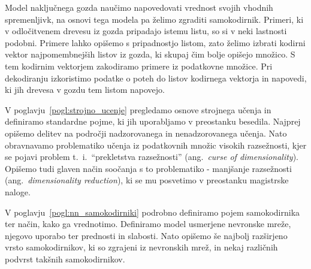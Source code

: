 \documentclass[12pt,a4paper,twoside]{article}
\theoremstyle{definition} %
\theoremstyle{plain} %
\numberwithin{equation}{section}  %
\begin{document}
Model naključnega gozda naučimo napovedovati vrednost svojih vhodnih spremenljivk, na osnovi tega modela pa želimo zgraditi samokodirnik.
Primeri, ki v odločitvenem drevesu iz gozda pripadajo istemu listu, so si v neki lastnosti podobni.
Primere lahko opišemo s pripadnostjo listom, zato želimo izbrati kodirni vektor najpomembnejših listov iz gozda, ki skupaj čim bolje opišejo množico.
S tem kodirnim vektorjem zakodiramo primere iz podatkovne množice.
Pri dekodiranju izkoristimo podatke o poteh do listov kodirnega vektorja in napovedi, ki jih drevesa v gozdu tem listom napovejo.


V poglavju~\ref{pogl:strojno_ucenje} pregledamo osnove strojnega učenja in definiramo standardne pojme, ki jih uporabljamo v preostanku besedila. 
Najprej opišemo delitev na področji nadzorovanega in nenadzorovanega učenja.
Nato obravnavamo problematiko učenja iz podatkovnih množic visokih razsežnosti, kjer se pojavi problem t.~i.~``prekletstva razsežnosti'' (ang.~\textsl{curse of dimensionality}). 
Opišemo tudi glaven način soočanja s to problematiko - manjšanje razsežnosti (ang.~\textsl{dimensionality reduction}), ki se mu posvetimo v preostanku magistrske naloge.

V poglavju~\ref{pogl:nn_samokodirniki} podrobno definiramo pojem samokodirnika ter način, kako ga vrednotimo.
Definiramo model usmerjene nevronske mreže, njegovo uporabo ter prednosti in slabosti.
Nato opišemo še najbolj razširjeno vrsto samokodirnikov, ki so zgrajeni iz nevronskih mrež, in nekaj različnih podvrst takšnih samokodirnikov.
\end{document}
